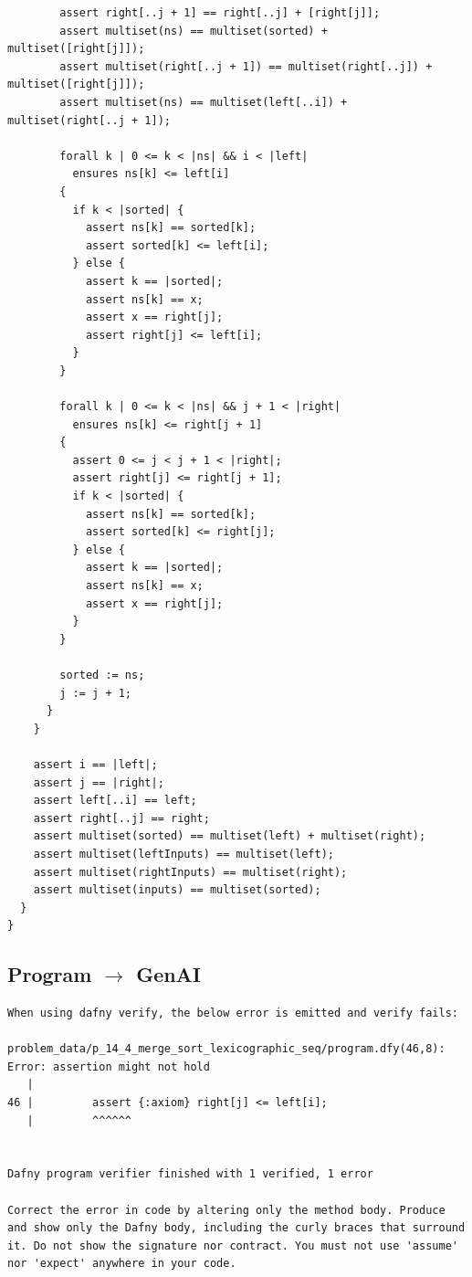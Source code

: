 \documentclass{article}
\begin{document}
\begin{lstlisting}
        assert right[..j + 1] == right[..j] + [right[j]];
        assert multiset(ns) == multiset(sorted) + multiset([right[j]]);
        assert multiset(right[..j + 1]) == multiset(right[..j]) + multiset([right[j]]);
        assert multiset(ns) == multiset(left[..i]) + multiset(right[..j + 1]);

        forall k | 0 <= k < |ns| && i < |left|
          ensures ns[k] <= left[i]
        {
          if k < |sorted| {
            assert ns[k] == sorted[k];
            assert sorted[k] <= left[i];
          } else {
            assert k == |sorted|;
            assert ns[k] == x;
            assert x == right[j];
            assert right[j] <= left[i];
          }
        }

        forall k | 0 <= k < |ns| && j + 1 < |right|
          ensures ns[k] <= right[j + 1]
        {
          assert 0 <= j < j + 1 < |right|;
          assert right[j] <= right[j + 1];
          if k < |sorted| {
            assert ns[k] == sorted[k];
            assert sorted[k] <= right[j];
          } else {
            assert k == |sorted|;
            assert ns[k] == x;
            assert x == right[j];
          }
        }

        sorted := ns;
        j := j + 1;
      }
    }

    assert i == |left|;
    assert j == |right|;
    assert left[..i] == left;
    assert right[..j] == right;
    assert multiset(sorted) == multiset(left) + multiset(right);
    assert multiset(leftInputs) == multiset(left);
    assert multiset(rightInputs) == multiset(right);
    assert multiset(inputs) == multiset(sorted);
  }
}
\end{lstlisting}
\subsection*{Program $\rightarrow$ GenAI}
\begin{lstlisting}
When using dafny verify, the below error is emitted and verify fails:

problem_data/p_14_4_merge_sort_lexicographic_seq/program.dfy(46,8): Error: assertion might not hold
   |
46 |         assert {:axiom} right[j] <= left[i];
   |         ^^^^^^


Dafny program verifier finished with 1 verified, 1 error

Correct the error in code by altering only the method body. Produce and show only the Dafny body, including the curly braces that surround it. Do not show the signature nor contract. You must not use 'assume' nor 'expect' anywhere in your code.
\end{lstlisting}
\end{document}
